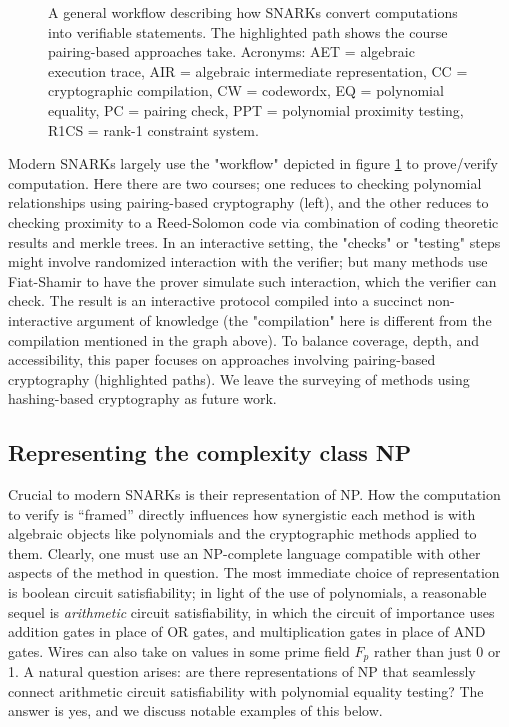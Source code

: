 \begin{figure}[htbp]
    \caption{A general workflow describing how SNARKs convert computations into verifiable statements. The highlighted path shows the course pairing-based approaches take. Acronyms: AET = algebraic execution trace, AIR = algebraic intermediate representation, CC = cryptographic compilation, CW = codewordx, EQ = polynomial equality, PC = pairing check, PPT = polynomial proximity testing, R1CS = rank-1 constraint system.}
    \label{fig:snark-workflow}
\end{figure}
Modern SNARKs largely use the "workflow" depicted in figure \ref{fig:snark-workflow} to prove/verify computation. Here there are two courses; one reduces to checking polynomial relationships using pairing-based cryptography (left), and the other reduces to checking proximity to a Reed-Solomon code via combination of coding theoretic results and merkle trees. In an interactive setting, the "checks" or "testing" steps might involve randomized interaction with the verifier; but many methods use Fiat-Shamir to have the prover simulate such interaction, which the verifier can check. The result is an interactive protocol compiled into a succinct non-interactive argument of knowledge (the "compilation" here is different from the compilation mentioned in the graph above). To balance coverage, depth, and accessibility, this paper focuses on approaches involving pairing-based cryptography (highlighted paths). We leave the surveying of methods using hashing-based cryptography as future work.

\subsection{Representing the complexity class NP}
\noindent Crucial to modern SNARKs is their representation of NP. How the computation to verify is ``framed'' directly influences how synergistic each method is with algebraic objects like polynomials and the cryptographic methods applied to them. Clearly, one must use an NP-complete language compatible with other aspects of the method in question. The most immediate choice of representation is boolean circuit satisfiability; in light of the use of polynomials, a reasonable sequel is \textit{arithmetic} circuit satisfiability, in which the circuit of importance uses addition gates in place of OR gates, and multiplication gates in place of AND gates. Wires can also take on values in some prime field $F_p$  rather than just 0 or 1. A natural question arises: are there representations of NP that seamlessly connect arithmetic circuit satisfiability with polynomial equality testing? The answer is yes, and we discuss notable examples of this below.

